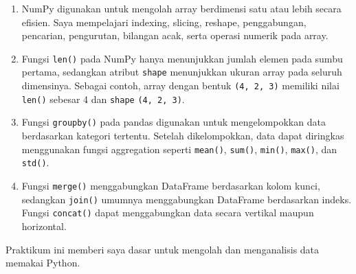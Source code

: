 \documentclass[a4paper,oneside,12pt]{report}
\begin{document}
\begin{enumerate}
    \item NumPy digunakan untuk mengolah array berdimensi satu atau lebih secara efisien. Saya mempelajari indexing, slicing, reshape, penggabungan, pencarian, pengurutan, bilangan acak, serta operasi numerik pada array.
    \item Fungsi \texttt{len()} pada NumPy hanya menunjukkan jumlah elemen pada sumbu pertama, sedangkan atribut \texttt{shape} menunjukkan ukuran array pada seluruh dimensinya. Sebagai contoh, array dengan bentuk \texttt{(4, 2, 3)} memiliki nilai \texttt{len()} sebesar 4 dan \texttt{shape} \texttt{(4, 2, 3)}.
    \item Fungsi \texttt{groupby()} pada pandas digunakan untuk mengelompokkan data berdasarkan kategori tertentu. Setelah dikelompokkan, data dapat diringkas menggunakan fungsi aggregation seperti \texttt{mean()}, \texttt{sum()}, \texttt{min()}, \texttt{max()}, dan \texttt{std()}.
    \item Fungsi \texttt{merge()} menggabungkan DataFrame berdasarkan kolom kunci, sedangkan \texttt{join()} umumnya menggabungkan DataFrame berdasarkan indeks. Fungsi \texttt{concat()} dapat menggabungkan data secara vertikal maupun horizontal.
\end{enumerate}

Praktikum ini memberi saya dasar untuk mengolah dan menganalisis data memakai Python.
\end{document}
